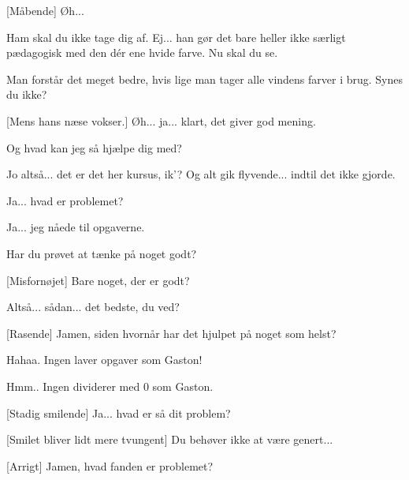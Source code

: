 \documentclass[a4paper,11pt]{article}
\begin{document}
\begin{sketch}
[Måbende] Øh...


 Ham skal du ikke tage dig af. Ej... han gør det bare heller ikke særligt pædagogisk med den dér ene hvide farve. Nu skal du se.


 Man forstår det meget bedre, hvis lige man tager alle vindens farver i brug. Synes du ikke?

[Mens hans næse vokser.] Øh... ja... klart, det giver god mening.

 Og hvad kan jeg så hjælpe dig med?

 Jo altså... det er det her kursus, ik'? Og alt gik flyvende... indtil det ikke gjorde.

 Ja... hvad er problemet?

 Ja... jeg nåede til opgaverne.

 Har du prøvet at tænke på noget godt?

[Misfornøjet] Bare noget, der er godt?

 Altså... sådan... det bedste, du ved?

[Rasende] Jamen, siden hvornår har det hjulpet på noget som helst?


 Hahaa. Ingen laver opgaver som Gaston!


 Hmm.. Ingen dividerer med $0$ som Gaston.


[Stadig smilende] Ja... hvad er så dit problem?


[Smilet bliver lidt mere tvungent] Du behøver ikke at være genert...


[Arrigt] Jamen, hvad fanden er problemet?



\end{sketch}
\end{document}
